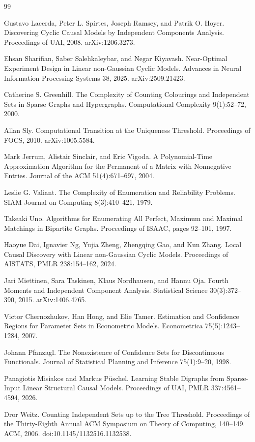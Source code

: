 \documentclass{article}
\begin{document}
\begin{thebibliography}{99}

   Gustavo Lacerda, Peter L. Spirtes, Joseph Ramsey, and Patrik O. Hoyer. Discovering Cyclic Causal Models by Independent Components Analysis. Proceedings of UAI, 2008. arXiv:1206.3273.

   Ehsan Sharifian, Saber Salehkaleybar, and Negar Kiyavash. Near-Optimal Experiment Design in Linear non-Gaussian Cyclic Models. Advances in Neural Information Processing Systems 38, 2025. arXiv:2509.21423.

   Catherine S. Greenhill. The Complexity of Counting Colourings and Independent Sets in Sparse Graphs and Hypergraphs. Computational Complexity 9(1):52--72, 2000.

   Allan Sly. Computational Transition at the Uniqueness Threshold. Proceedings of FOCS, 2010. arXiv:1005.5584.

   Mark Jerrum, Alistair Sinclair, and Eric Vigoda. A Polynomial-Time Approximation Algorithm for the Permanent of a Matrix with Nonnegative Entries. Journal of the ACM 51(4):671--697, 2004.

   Leslie G. Valiant. The Complexity of Enumeration and Reliability Problems. SIAM Journal on Computing 8(3):410--421, 1979.

   Takeaki Uno. Algorithms for Enumerating All Perfect, Maximum and Maximal Matchings in Bipartite Graphs. Proceedings of ISAAC, pages 92--101, 1997.

   Haoyue Dai, Ignavier Ng, Yujia Zheng, Zhengqing Gao, and Kun Zhang. Local Causal Discovery with Linear non-Gaussian Cyclic Models. Proceedings of AISTATS, PMLR 238:154--162, 2024.

   Jari Miettinen, Sara Taskinen, Klaus Nordhausen, and Hannu Oja. Fourth Moments and Independent Component Analysis. Statistical Science 30(3):372--390, 2015. arXiv:1406.4765.

   Victor Chernozhukov, Han Hong, and Elie Tamer. Estimation and Confidence Regions for Parameter Sets in Econometric Models. Econometrica 75(5):1243--1284, 2007.

   Johann Pfanzagl. The Nonexistence of Confidence Sets for Discontinuous Functionals. Journal of Statistical Planning and Inference 75(1):9--20, 1998.

   Panagiotis Misiakos and Markus Püschel. Learning Stable Digraphs from Sparse-Input Linear Structural Causal Models. Proceedings of UAI, PMLR 337:4561--4594, 2026.

   Dror Weitz. Counting Independent Sets up to the Tree Threshold. Proceedings of the Thirty-Eighth Annual ACM Symposium on Theory of Computing, 140--149. ACM, 2006. doi:10.1145/1132516.1132538.

\end{thebibliography}
\end{document}
